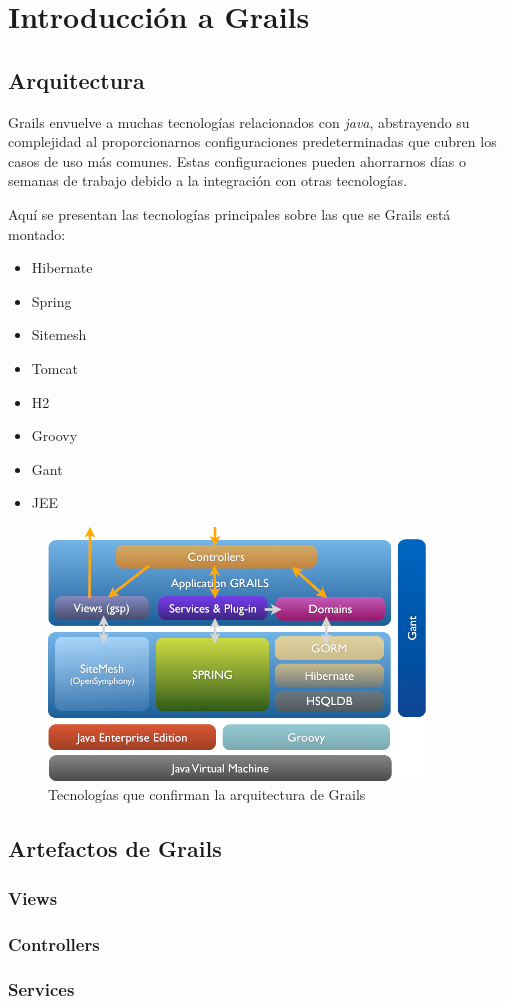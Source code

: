 \chapter{Introducci\'on a Grails}
\section{Arquitectura}
Grails envuelve a muchas tecnolog\'ias relacionados con \textit{java}, abstrayendo su complejidad al proporcionarnos configuraciones predeterminadas que cubren los casos de uso m\'as comunes. Estas configuraciones pueden ahorrarnos d\'ias o semanas de trabajo debido a la integraci\'on con otras tecnolog\'ias.

Aqu\'i se presentan las tecnolog\'ias principales sobre las que se Grails est\'a montado:

\begin{multicols}{2}
\begin{itemize}
  \item Hibernate
  \item Spring
  \item Sitemesh
  \item Tomcat
  \item H2
  \item Groovy
  \item Gant
  \item JEE
\end{itemize}
\end{multicols}

\begin{figure}[ht!]

    \includegraphics[width=100mm]{img/arch}
    \caption{Tecnolog\'ias que confirman la arquitectura de Grails}
    \label{arquitectura}

\end{figure}

\section{Artefactos de Grails}

\subsection{Views}
\subsection{Controllers}
\subsection{Services}